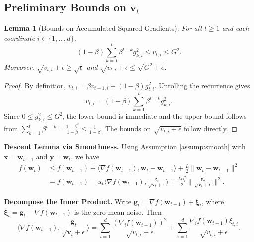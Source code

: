 \documentclass{article}
\newcommand{\norm}[1]{\|#1\|}
\newcommand{\inner}[2]{\langle #1, #2 \rangle}
\newcommand{\grad}{\nabla}
\newcommand{\step}[1]{\text{[Step #1]}}
\newcommand{\vect}[1]{\bm{#1}}
\newtheorem{lemma}{Lemma}
\begin{document}
\subsection{Preliminary Bounds on \(\vect{v}_t\)}

\begin{lemma}[Bounds on Accumulated Squared Gradients] \label{lem:v_bounds}
For all \(t \ge 1\) and each coordinate \(i \in \{1,\dots,d\}\),
\[
(1-\beta) \sum_{k=1}^t \beta^{t-k} g_{k,i}^2 \le v_{t,i} \le G^2.
\]
Moreover, \(\sqrt{v_{t,i} + \epsilon} \ge \sqrt{\epsilon}\) and \(\sqrt{v_{t,i} + \epsilon} \le \sqrt{G^2 + \epsilon}\).
\end{lemma}
\begin{proof}
By definition, \(v_{t,i} = \beta v_{t-1,i} + (1-\beta) g_{t,i}^2\). Unrolling the recurrence gives
\[
v_{t,i} = (1-\beta) \sum_{k=1}^t \beta^{t-k} g_{k,i}^2.
\]
Since \(0 \le g_{k,i}^2 \le G^2\), the lower bound is immediate and the upper bound follows from \(\sum_{k=1}^t \beta^{t-k} = \frac{1-\beta^t}{1-\beta} \le \frac{1}{1-\beta}\). The bounds on \(\sqrt{v_{t,i}+\epsilon}\) follow directly.
\end{proof}

\step{1} \textbf{Descent Lemma via Smoothness.} Using Assumption \ref{assump:smooth} with \(\vect{x} = \vect{w}_{t-1}\) and \(\vect{y} = \vect{w}_t\), we have
\begin{align}
f(\vect{w}_t) &\le f(\vect{w}_{t-1}) + \inner{\grad f(\vect{w}_{t-1})}{\vect{w}_t - \vect{w}_{t-1}} + \frac{L}{2} \norm{\vect{w}_t - \vect{w}_{t-1}}^2 \nonumber \\
&= f(\vect{w}_{t-1}) - \alpha_t \inner{\grad f(\vect{w}_{t-1})}{\frac{\vect{g}_t}{\sqrt{\vect{v}_t + \epsilon}}} + \frac{L \alpha_t^2}{2} \norm{\frac{\vect{g}_t}{\sqrt{\vect{v}_t + \epsilon}}}^2. \label{eq:descent}
\end{align}

\step{2} \textbf{Decompose the Inner Product.} Write \(\vect{g}_t = \grad f(\vect{w}_{t-1}) + \vect{\xi}_t\), where \(\vect{\xi}_t = \vect{g}_t - \grad f(\vect{w}_{t-1})\) is the zero-mean noise. Then
\[
\inner{\grad f(\vect{w}_{t-1})}{\frac{\vect{g}_t}{\sqrt{\vect{v}_t + \epsilon}}} = \sum_{i=1}^d \frac{(\grad_i f(\vect{w}_{t-1}))^2}{\sqrt{v_{t,i} + \epsilon}} + \sum_{i=1}^d \frac{\grad_i f(\vect{w}_{t-1}) \xi_{t,i}}{\sqrt{v_{t,i} + \epsilon}}.
\]
\end{document}
